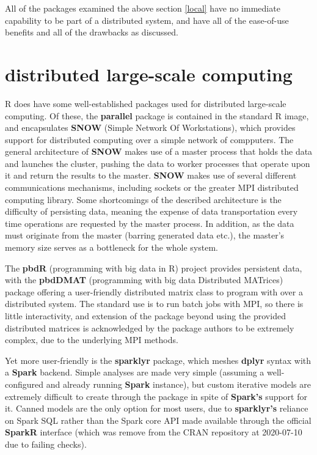 \documentclass[a4paper,10pt]{article}
\begin{document}
All of the packages examined the above section \ref{local} have no immediate capability to be part of a distributed system, and have all of the ease-of-use benefits and all of the drawbacks as discussed.

\section{distributed large-scale computing}

R does have some well-established packages used for distributed large-scale computing.
Of these, the \textbf{parallel} package is contained in the standard R image, and encapsulates \textbf{SNOW} (Simple Network Of Workstations), which provides support for distributed computing over a simple network of compputers.
The general architecture of \textbf{SNOW} makes use of a master process that holds the data and launches the cluster, pushing the data to worker processes that operate upon it and return the results to the master. \textbf{SNOW} makes use of several different communications mechanisms, including sockets or the greater MPI distributed computing library.
Some shortcomings of the described architecture is the difficulty of persisting data, meaning the expense of data transportation every time operations are requested by the master process.
In addition, as the data must originate from the master (barring generated data etc.), the master's memory size serves as a bottleneck for the whole system.

The \textbf{pbdR} (programming with big data in R) project provides persistent data, with the \textbf{pbdDMAT} (programming with big data Distributed MATrices) package offering a user-friendly distributed matrix class to program with over a distributed system.
The standard use is to run batch jobs with MPI, so there is little interactivity, and extension of the package beyond using the provided distributed matrices is acknowledged by the package authors to be extremely complex, due to the underlying MPI methods.

Yet more user-friendly is the \textbf{sparklyr} package, which meshes \textbf{dplyr} syntax with a \textbf{Spark} backend.
Simple analyses are made very simple (assuming a well-configured and already running \textbf{Spark} instance), but custom iterative models are extremely difficult to create through the package in spite of \textbf{Spark's} support for it. 
Canned models are the only option for most users, due to \textbf{sparklyr's} reliance on Spark SQL rather than the Spark core API made available through the official \textbf{SparkR} interface (which was remove from the CRAN repository at 2020-07-10 due to failing checks).
\end{document}

